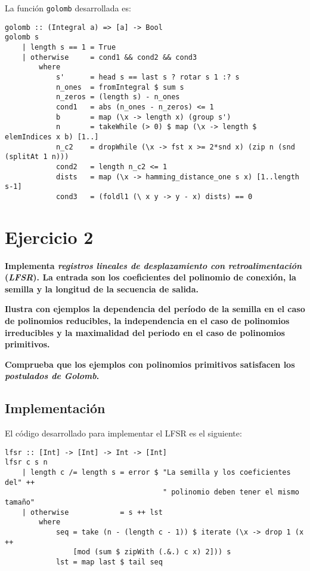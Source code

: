 \documentclass[10pt,spanish]{article}
\begin{document}
La función \texttt{golomb} desarrollada es:

\begin{verbatim}
golomb :: (Integral a) => [a] -> Bool
golomb s 
    | length s == 1 = True
    | otherwise     = cond1 && cond2 && cond3
        where
            s'      = head s == last s ? rotar s 1 :? s
            n_ones  = fromIntegral $ sum s
            n_zeros = (length s) - n_ones
            cond1   = abs (n_ones - n_zeros) <= 1
            b       = map (\x -> length x) (group s')
            n       = takeWhile (> 0) $ map (\x -> length $ elemIndices x b) [1..]
            n_c2    = dropWhile (\x -> fst x >= 2*snd x) (zip n (snd (splitAt 1 n))) 
            cond2   = length n_c2 <= 1
            dists   = map (\x -> hamming_distance_one s x) [1..length s-1]
            cond3   = (foldl1 (\ x y -> y - x) dists) == 0
\end{verbatim}

\section{\textcolor{azul}Ejercicio 2}
\textbf{Implementa \textit{\textcolor{azul}{registros lineales de desplazamiento con retroalimentación}} (\textit{\textcolor{azul}{LFSR}}). La entrada son los coeficientes del polinomio de conexión, la semilla y la longitud de la secuencia de salida.}

\textbf{Ilustra con ejemplos la dependencia del período de la semilla en el caso de polinomios reducibles, la independencia en el caso de polinomios irreducibles y la maximalidad del periodo en el caso de polinomios primitivos.}

\textbf{Comprueba que los ejemplos con polinomios primitivos satisfacen los \textit{\textcolor{azul}{postulados de Golomb}}.}

\subsection{\textcolor{azul}Implementación}
El código desarrollado para implementar el LFSR es el siguiente:

\begin{verbatim}
lfsr :: [Int] -> [Int] -> Int -> [Int]
lfsr c s n
    | length c /= length s = error $ "La semilla y los coeficientes del" ++
                                     " polinomio deben tener el mismo tamaño"
    | otherwise            = s ++ lst
        where
            seq = take (n - (length c - 1)) $ iterate (\x -> drop 1 (x ++ 
                [mod (sum $ zipWith (.&.) c x) 2])) s
            lst = map last $ tail seq
\end{verbatim}
\end{document}
